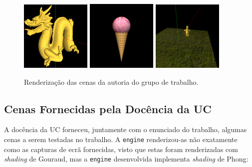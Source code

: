 \documentclass[12pt, a4paper]{article}
\begin{document}
\begin{figure}[H]
    \includegraphics[width=0.3\textwidth]{res/phase4/results/Dragon.png}
    \includegraphics[width=0.3\textwidth]{res/phase4/results/IceCream.png}
    \includegraphics[width=0.3\textwidth]{res/phase4/results/ThirdPerson.png}
    \caption{Renderização das cenas da autoria do grupo de trabalho.}
\end{figure}

\subsection{Cenas Fornecidas pela Docência da UC}

A docência da UC forneceu, juntamente com o enunciado do trabalho, algumas cenas a serem testadas no
trabalho. A \texttt{engine} renderizou-as não exatamente como as capturas de ecrã fornecidas, visto
que estas foram renderizadas com \emph{shading} de Gouraud, mas a \texttt{engine} desenvolvida
implementa \emph{shading} de Phong:
\end{document}
